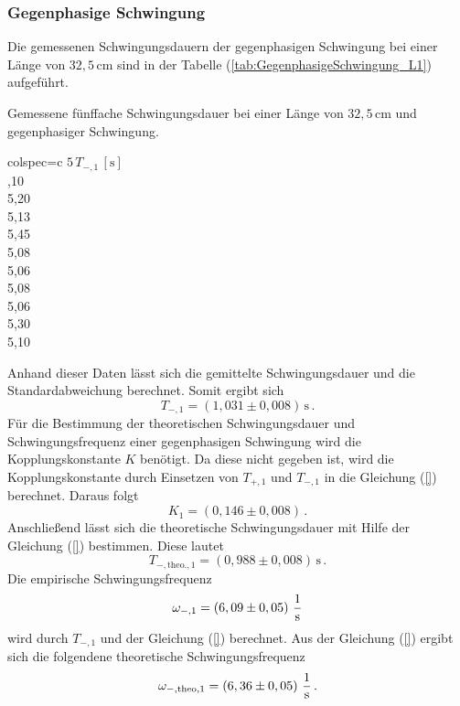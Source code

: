 \subsubsection{Gegenphasige Schwingung}
\label{sec:GegenphasigeSchwingung_KurzelPendel}
Die gemessenen Schwingungsdauern der gegenphasigen Schwingung bei einer Länge von $32,5\, \unit{\centi\meter}$ sind 
in der Tabelle (\ref{tab:GegenphasigeSchwingung_L1}) aufgeführt. 
\begin{table}[H]
  \centering
  \caption{Gemessene fünffache Schwingungsdauer bei einer Länge von $32,5\, \unit{\centi\meter}$ und gegenphasiger Schwingung.}
  \label{tab:GegenphasigeSchwingung_L1}
  \begin{tblr}{colspec={c}}
      \toprule
      $5\, T_{-, 1}\,\left[\unit{\second}\right]$\\
      ,10 \\
      5,20 \\
      5,13 \\
      5,45 \\
      5,08 \\
      5,06 \\
      5,08 \\
      5,06 \\
      5,30 \\
      5,10 \\
      \bottomrule
  \end{tblr}
\end{table}
Anhand dieser Daten lässt sich die gemittelte Schwingungsdauer und die Standardabweichung berechnet. Somit ergibt sich
$$T_{-, 1} = \left(1,031 \pm 0,008 \right)\, \unit{\second}\,.$$ 
Für die Bestimmung der theoretischen Schwingungsdauer und Schwingungsfrequenz einer gegenphasigen Schwingung wird die Kopplungskonstante $K$ benötigt. Da
diese nicht gegeben ist, wird die Kopplungskonstante durch Einsetzen von $T_{+,1}$ und $T_{-,1}$ in die Gleichung (\ref{}) berechnet.
Daraus folgt
$$K_1 = \left( 0,146 \pm 0,008 \right)\,.$$
Anschließend lässt sich die theoretische Schwingungsdauer mit Hilfe der Gleichung (\ref{}) bestimmen. Diese lautet
$$T_{-,\text{theo.},1} = \left( 0,988 \pm 0,008 \right)\, \unit{\second}\,.$$
Die empirische Schwingungsfrequenz 
$$\omega_{-,1} = \left( 6,09 \pm 0,05 \right)\, \unit[per-mode=fraction]{\per \second}$$ wird durch $T_{-,1}$ und der Gleichung (\ref{})
berechnet. Aus der Gleichung (\ref{}) ergibt sich die folgendene theoretische Schwingungsfrequenz
$$\omega_{-,\text{theo},1} = \left( 6,36 \pm 0,05 \right)\,\unit[per-mode=fraction]{\per \second}\,.$$

